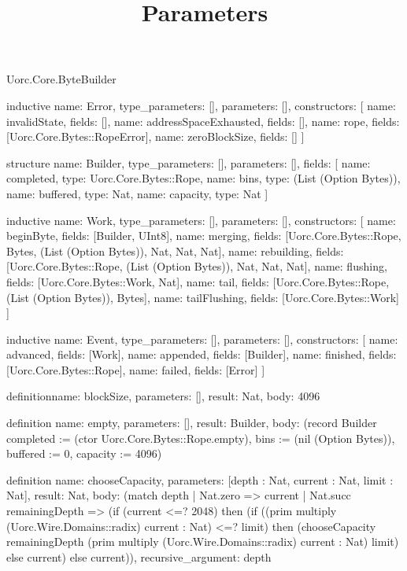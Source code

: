 \begin{lexlean}{Uorc.Core.ByteBuilder}
\title{Parameters}
\begin{semanticmodule}
inductive{
  name: Error,
  type_parameters: [],
  parameters: [],
  constructors: [
    {name: invalidState, fields: []},
    {name: addressSpaceExhausted, fields: []},
    {name: rope, fields: [Uorc.Core.Bytes::RopeError]},
    {name: zeroBlockSize, fields: []}
  ]
}

structure{
  name: Builder,
  type_parameters: [],
  parameters: [],
  fields: [
    {name: completed, type: Uorc.Core.Bytes::Rope},
    {name: bins, type: (List (Option Bytes))},
    {name: buffered, type: Nat},
    {name: capacity, type: Nat}
  ]
}

inductive{
  name: Work,
  type_parameters: [],
  parameters: [],
  constructors: [
    {name: beginByte, fields: [Builder, UInt8]},
    {name: merging, fields: [Uorc.Core.Bytes::Rope, Bytes, (List (Option Bytes)), Nat, Nat, Nat]},
    {name: rebuilding, fields: [Uorc.Core.Bytes::Rope, (List (Option Bytes)), Nat, Nat, Nat]},
    {name: flushing, fields: [Uorc.Core.Bytes::Work, Nat]},
    {name: tail, fields: [Uorc.Core.Bytes::Rope, (List (Option Bytes)), Bytes]},
    {name: tailFlushing, fields: [Uorc.Core.Bytes::Work]}
  ]
}

inductive{
  name: Event,
  type_parameters: [],
  parameters: [],
  constructors: [
    {name: advanced, fields: [Work]},
    {name: appended, fields: [Builder]},
    {name: finished, fields: [Uorc.Core.Bytes::Rope]},
    {name: failed, fields: [Error]}
  ]
}

definition{name: blockSize, parameters: [], result: Nat, body: 4096}

definition{
  name: empty,
  parameters: [],
  result: Builder,
  body: (record Builder {completed := (ctor Uorc.Core.Bytes::Rope.empty), bins := (nil (Option Bytes)), buffered := 0, capacity := 4096})
}

definition{
  name: chooseCapacity,
  parameters: [depth : Nat, current : Nat, limit : Nat],
  result: Nat,
  body: (match depth
    | Nat.zero => current
    | Nat.succ remainingDepth => (if (current <=? 2048) then (if ((prim multiply (Uorc.Wire.Domains::radix) current : Nat) <=? limit) then (chooseCapacity remainingDepth (prim multiply (Uorc.Wire.Domains::radix) current : Nat) limit) else current) else current)),
  recursive_argument: depth
}


\end{semanticmodule}
\end{lexlean}
